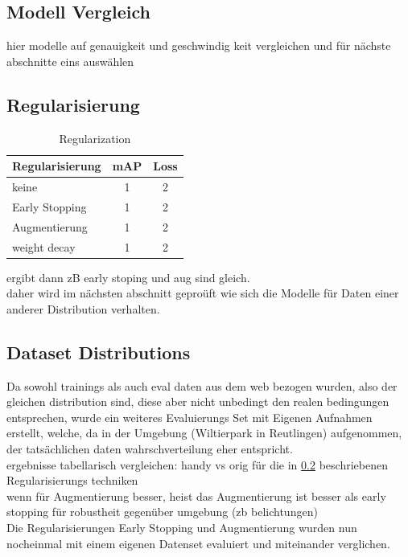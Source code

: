 \subsection{Modell Vergleich}

hier modelle auf genauigkeit und geschwindig keit vergleichen 
und für nächste abschnitte eins auswählen



\subsection{Regularisierung}\label{subsec:regularization}

\begin{table}[htb]
    \centering
    \label{tab:regularization}
    \begin{tabular}{| l || c | c |} 
        \hline
        Regularisierung & mAP & Loss\\
        \hline
        keine & 1 & 2 \\
        \hline
        Early Stopping & 1 & 2 \\
        \hline
        Augmentierung & 1 & 2 \\
        \hline
        weight decay & 1 & 2 \\
        \hline
    \end{tabular}        
    \caption{Regularization}
\end{table}


ergibt dann zB early stoping und aug sind gleich.
\\
daher wird im nächsten abschnitt geproüft wie sich 
die Modelle für Daten einer anderer Distribution verhalten.


\subsection{Dataset Distributions}\label{subsec:distributions}
Da sowohl trainings als auch eval daten aus dem web bezogen wurden,
also der gleichen distribution sind, diese aber nicht unbedingt 
den realen bedingungen entsprechen, wurde ein weiteres Evaluierungs 
Set mit Eigenen Aufnahmen erstellt, welche, da in der Umgebung 
(Wiltierpark in Reutlingen) aufgenommen, der tatsächlichen daten 
wahrschverteilung eher entspricht.
\\
ergebnisse tabellarisch vergleichen: handy vs orig für die in 
\ref{subsec:regularization} beschriebenen Regularisierungs techniken\\
wenn für Augmentierung besser, heist das Augmentierung ist besser als 
early stopping für robustheit gegenüber umgebung (zb belichtungen)
\\
Die Regularisierungen Early Stopping und Augmentierung wurden 
nun nocheinmal mit einem eigenen Datenset evaluiert und miteinander 
verglichen.


